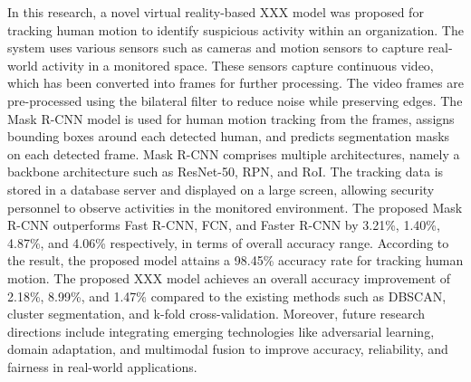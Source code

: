 \documentclass[conference]{IEEEtran}
\begin{document}
In this research, a novel virtual reality-based XXX model was proposed for tracking human motion to identify suspicious activity within an organization. The system uses various sensors such as cameras and motion sensors to capture real-world activity in a monitored space. These sensors capture continuous video, which has been converted into frames for further processing. The video frames are pre-processed using the bilateral filter to reduce noise while preserving edges. The Mask R-CNN model is used for human motion tracking from the frames, assigns bounding boxes around each detected human, and predicts segmentation masks on each detected frame. Mask R-CNN comprises multiple architectures, namely a backbone architecture such as ResNet-50, RPN, and RoI. The tracking data is stored in a database server and displayed on a large screen, allowing security personnel to observe activities in the monitored environment. The proposed Mask R-CNN outperforms Fast R-CNN, FCN, and Faster R-CNN by 3.21\%, 1.40\%, 4.87\%, and 4.06\% respectively, in terms of overall accuracy range. According to the result, the proposed model attains a 98.45\% accuracy rate for tracking human motion. The proposed XXX model achieves an overall accuracy improvement of 2.18\%, 8.99\%, and 1.47\% compared to the existing methods such as DBSCAN, cluster segmentation, and k-fold cross-validation. Moreover, future research directions include integrating emerging technologies like adversarial learning, domain adaptation, and multimodal fusion to improve accuracy, reliability, and fairness in real-world applications.
\end{document}
